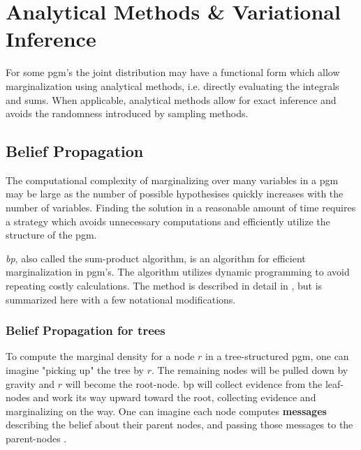 \chapter{Analytical Methods \& Variational Inference}
For some \acrshort{pgm}'s the joint distribution may have a functional form which allow marginalization using analytical methods, i.e. directly evaluating the integrals and sums. When applicable, analytical methods allow for exact inference and avoids the randomness introduced by sampling methods. %

\section{Belief Propagation}
The computational complexity of marginalizing over many variables in a \acrshort{pgm} may be large as the number of possible hypothesises quickly increases with the number of variables. Finding the solution in a reasonable amount of time requires a strategy which avoids unnecessary computations and efficiently utilize the structure of the \acrshort{pgm}. 

\textit{\acrfull{bp}}, also called the sum-product algorithm, is an algorithm for efficient marginalization in \acrshort{pgm}'s. The algorithm utilizes dynamic programming to avoid repeating costly calculations. The method is described in detail in \cite[p .~710]{murphy}, but is summarized here with a few notational modifications. 


\subsection{Belief Propagation for trees}
To compute the marginal density for a node $r$ in a tree-structured \acrshort{pgm}, one can imagine "picking up" the tree by $r$. The remaining nodes will be pulled down by gravity and $r$ will become the root-node. \acrshort{bp} will collect evidence from the leaf-nodes and work its way upward toward the root, collecting evidence and marginalizing on the way. One can imagine each node computes \textbf{messages} describing the belief about their parent nodes, and passing those messages to the parent-nodes \cite{murphy}.
